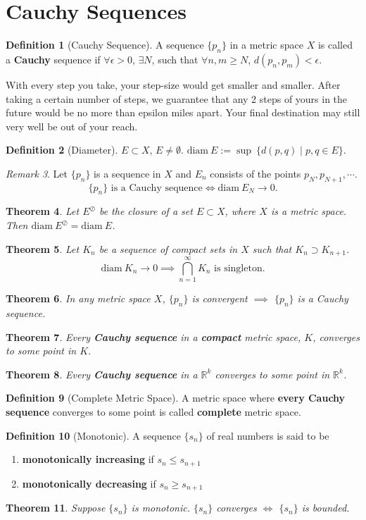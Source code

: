\documentclass[a4paper,12pt]{report}
\newcommand{\R}{\mathbb{R}}
\newcommand{\tb}{\textbf}
\newcommand{\diam}{\text{diam}\:}
\theoremstyle{plain}
\newtheorem{theorem}{\color{blue}Theorem}[chapter] %
\theoremstyle{definition}
\newtheorem{definition}[theorem]{\color{red}Definition} %
\theoremstyle{remark}
\newtheorem{remark}[theorem]{\color{ForestGreen}Remark} %
\begin{document}
\section{Cauchy Sequences}
\begin{definition}[Cauchy Sequence]
A sequence $\{p_n\}$ in a metric space $X$ is called a \tb{Cauchy} sequence if $\forall\epsilon>0$, $\exists N$, such that $\forall n,m\ge N$, $d(p_n,p_m)<\epsilon$.
\end{definition}
\begin{insight}
With every step you take, your step-size would get smaller and smaller. After taking a certain number of steps, we guarantee that any 2 steps of yours in the future would be no more than epsilon miles apart. Your final destination may still very well be out of your reach.
\end{insight}
\begin{definition}[Diameter]
$E\subset X$, $E\neq\emptyset$. $\diam E:= \sup \: \{d(p,q)\mid p,q\in E\}$.
\end{definition}
\begin{remark}
Let $\{p_n\}$ is a sequence in $X$ and $E_n$ consists of the points $p_N,p_{N+1},\cdots$.
\[
 \{p_n\} \text{ is a Cauchy sequence} \iff \diam E_N\to 0.
\]
\end{remark}
\begin{theorem}
Let $E^{\oslash}$ be the closure of a set $E\subset X$, where $X$ is a metric space. Then $\diam E^{\oslash}=\diam E$.
\end{theorem}
\begin{theorem}
Let $K_n$ be a sequence of compact sets in $X$ such that $K_n\supset K_{n+1}$.
\[
\diam K_n\to 0\implies \bigcap_{n=1}^\infty K_n \text{ is singleton}.
\]
\end{theorem}
\begin{theorem}
In any metric space $X$, $\{p_n\}$ is convergent $\implies$ $\{p_n\}$ is a Cauchy sequence.
\end{theorem}
\begin{theorem}
Every \tb{Cauchy sequence} in a \tb{compact} metric space, $K$, converges to some point in $K$.
\end{theorem}
\begin{theorem}
Every \tb{Cauchy sequence} in a $\R^k$ converges to some point in $\R^k$.
\end{theorem}
\begin{definition}[Complete Metric Space]
A metric space where \tb{every Cauchy sequence} converges to some point is called \tb{complete} metric space.
\end{definition}
\begin{definition}[Monotonic]
A sequence $\{s_n\}$ of real numbers is said to be
\begin{enumerate}
\item \tb{monotonically increasing} if $s_n\le s_{n+1}$
\item \tb{monotonically decreasing} if $s_n\ge s_{n+1}$
\end{enumerate}
\end{definition}
\begin{theorem}
Suppose $\{s_n\}$ is monotonic. $\{s_n\}$ converges $\iff$ $\{s_n\}$ is bounded.
\end{theorem}
\end{document}
